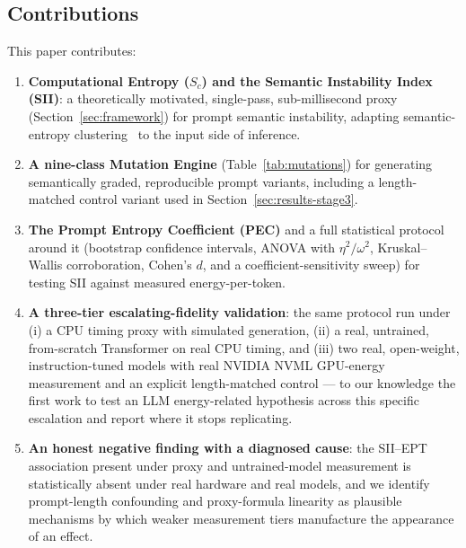 \documentclass[conference]{IEEEtran}
\begin{document}
\subsection{Contributions}
This paper contributes:
\begin{enumerate}
\item \textbf{Computational Entropy ($S_c$) and the Semantic
Instability Index (SII)}: a theoretically motivated, single-pass,
sub-millisecond proxy (Section~\ref{sec:framework}) for prompt
semantic instability, adapting semantic-entropy
clustering~\cite{kuhn2023semantic} to the input side of inference.
\item \textbf{A nine-class Mutation Engine} (Table~\ref{tab:mutations})
for generating semantically graded, reproducible prompt variants,
including a length-matched control variant used in
Section~\ref{sec:results-stage3}.
\item \textbf{The Prompt Entropy Coefficient (PEC)} and a full
statistical protocol around it (bootstrap confidence intervals, ANOVA
with $\eta^2/\omega^2$, Kruskal--Wallis corroboration, Cohen's $d$,
and a coefficient-sensitivity sweep) for testing SII against measured
energy-per-token.
\item \textbf{A three-tier escalating-fidelity validation}: the same
protocol run under (i) a CPU timing proxy with simulated generation,
(ii) a real, untrained, from-scratch Transformer on real CPU timing,
and (iii) two real, open-weight, instruction-tuned models with real
NVIDIA NVML GPU-energy measurement and an explicit length-matched
control --- to our knowledge the first work to test an LLM
energy-related hypothesis across this specific escalation and report
where it stops replicating.
\item \textbf{An honest negative finding with a diagnosed cause}: the
SII--EPT association present under proxy and untrained-model
measurement is statistically absent under real hardware and real
models, and we identify prompt-length confounding and proxy-formula
linearity as plausible mechanisms by which weaker measurement tiers
manufacture the appearance of an effect.
\end{enumerate}
\end{document}
